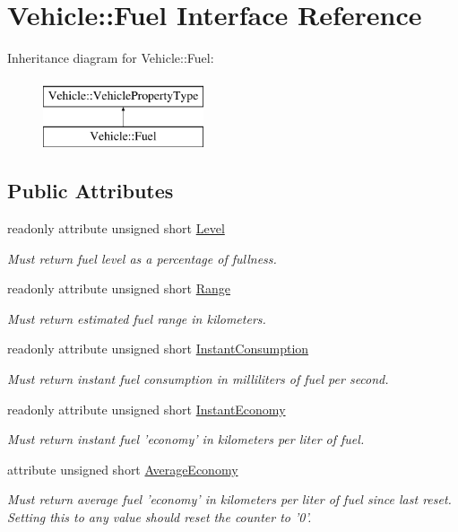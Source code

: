 \hypertarget{interfaceVehicle_1_1Fuel}{\section{Vehicle\-:\-:Fuel Interface Reference}
\label{interfaceVehicle_1_1Fuel}
}
Inheritance diagram for Vehicle\-:\-:Fuel\-:\begin{figure}[H]
\begin{center}
\leavevmode
\includegraphics[height=2.000000cm]{interfaceVehicle_1_1Fuel}
\end{center}
\end{figure}
\subsection*{Public Attributes}
\begin{DoxyCompactItemize}
\item 
readonly attribute unsigned short \hyperlink{interfaceVehicle_1_1Fuel_a817cb4ce8e1f3a2cb70149c4043b32da}{Level}
\begin{DoxyCompactList}\small\item\em Must return fuel level as a percentage of fullness. \end{DoxyCompactList}\item 
readonly attribute unsigned short \hyperlink{interfaceVehicle_1_1Fuel_a73c23d52245a14a5e4ab19e07e3a95ca}{Range}
\begin{DoxyCompactList}\small\item\em Must return estimated fuel range in kilometers. \end{DoxyCompactList}\item 
readonly attribute unsigned short \hyperlink{interfaceVehicle_1_1Fuel_ad1e983a16428bf7c48726ebd934f70f5}{Instant\-Consumption}
\begin{DoxyCompactList}\small\item\em Must return instant fuel consumption in milliliters of fuel per second. \end{DoxyCompactList}\item 
readonly attribute unsigned short \hyperlink{interfaceVehicle_1_1Fuel_ae6204c7c634a6454afd2e0a269f30a1b}{Instant\-Economy}
\begin{DoxyCompactList}\small\item\em Must return instant fuel 'economy' in kilometers per liter of fuel. \end{DoxyCompactList}\item 
attribute unsigned short \hyperlink{interfaceVehicle_1_1Fuel_aeb332abcbbb38663fe5e0f66436abcb2}{Average\-Economy}
\begin{DoxyCompactList}\small\item\em Must return average fuel 'economy' in kilometers per liter of fuel since last reset. Setting this to any value should reset the counter to '0'. \end{DoxyCompactList}\end{DoxyCompactItemize}
